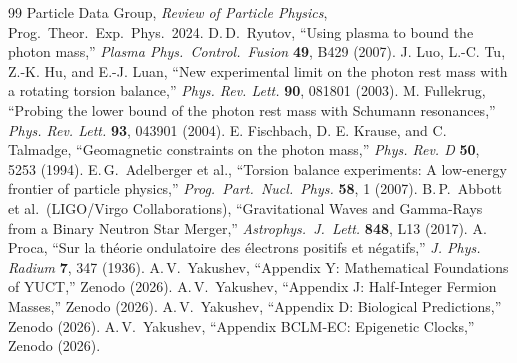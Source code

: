 \documentclass[12pt,a4paper]{article}
\begin{document}
	\begin{thebibliography}{99}
		 Particle Data Group, \emph{Review of Particle Physics}, Prog.\ Theor.\ Exp.\ Phys.\ 2024.
		 D.\,D.\ Ryutov, ``Using plasma to bound the photon mass,'' \emph{Plasma Phys.\ Control.\ Fusion} \textbf{49}, B429 (2007).
		 J. Luo, L.-C. Tu, Z.-K. Hu, and E.-J. Luan, ``New experimental limit on the photon rest mass with a rotating torsion balance,'' \emph{Phys. Rev. Lett.} \textbf{90}, 081801 (2003).
		 M. Fullekrug, ``Probing the lower bound of the photon rest mass with Schumann resonances,'' \emph{Phys. Rev. Lett.} \textbf{93}, 043901 (2004).
		 E. Fischbach, D. E. Krause, and C. Talmadge, ``Geomagnetic constraints on the photon mass,'' \emph{Phys. Rev. D} \textbf{50}, 5253 (1994).
		 E.\,G.\ Adelberger et al., ``Torsion balance experiments: A low‑energy frontier of particle physics,'' \emph{Prog.\ Part.\ Nucl.\ Phys.} \textbf{58}, 1 (2007).
		 B.\,P.\ Abbott et al.\ (LIGO/Virgo Collaborations), ``Gravitational Waves and Gamma‑Rays from a Binary Neutron Star Merger,'' \emph{Astrophys.\ J.\ Lett.} \textbf{848}, L13 (2017).
		 A. Proca, ``Sur la théorie ondulatoire des électrons positifs et négatifs,'' \emph{J. Phys. Radium} \textbf{7}, 347 (1936).
		 A.\,V.\ Yakushev, ``Appendix Y: Mathematical Foundations of YUCT,'' Zenodo (2026).
		 A.\,V.\ Yakushev, ``Appendix J: Half‑Integer Fermion Masses,'' Zenodo (2026).
		 A.\,V.\ Yakushev, ``Appendix D: Biological Predictions,'' Zenodo (2026).
		 A.\,V.\ Yakushev, ``Appendix BCLM‑EC: Epigenetic Clocks,'' Zenodo (2026).
	\end{thebibliography}
	
\end{document}
